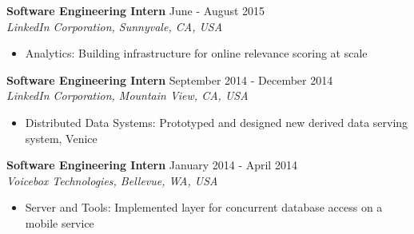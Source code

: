 \documentclass[10pt]{res} %
\begin{document}
\textbf{Software Engineering Intern} \hfill June - August 2015 \\
{\sl LinkedIn Corporation, Sunnyvale, CA, USA }
\begin{itemize}  %
    \item Analytics: Building infrastructure for online relevance scoring at scale
\end{itemize}

\textbf{Software Engineering Intern} \hfill September 2014 - December 2014 \\[2pt]
{\sl LinkedIn Corporation, Mountain View, CA, USA} 
\begin{itemize}  %
    \item Distributed Data Systems: Prototyped and designed new derived data serving system, Venice
\end{itemize}
 
\textbf{Software Engineering Intern} \hfill January 2014 - April 2014 \\[2pt]
{\sl Voicebox Technologies, Bellevue, WA, USA} 
\begin{itemize}  %
    \item Server and Tools: Implemented layer for concurrent database access on a mobile service
\end{itemize}
\end{document}
